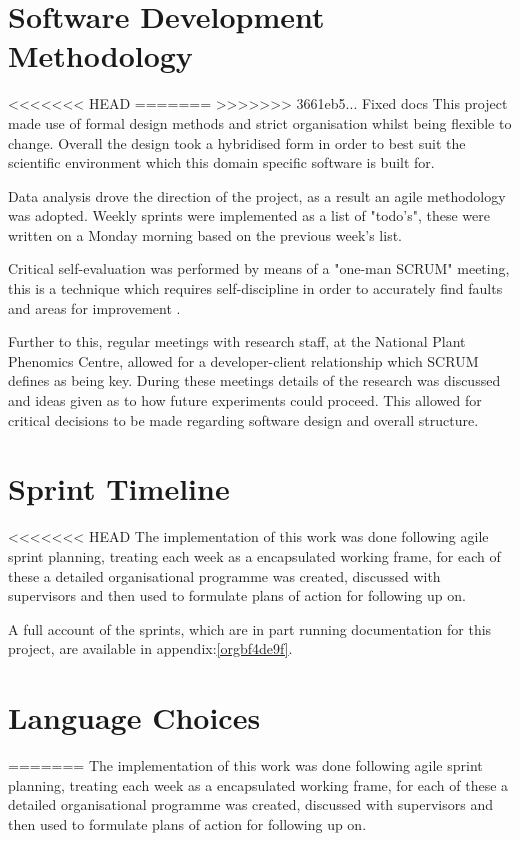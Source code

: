 \documentclass[11pt]{report}
\begin{document}
\section{Software Development Methodology}
<<<<<<< HEAD
\label{sec:org466d032}
=======
\label{sec:orged044ce}
>>>>>>> 3661eb5... Fixed docs
This project made use of formal design methods and strict organisation whilst being flexible to change. Overall the design took a hybridised form in order to best suit the scientific environment which this domain specific software is built for.

Data analysis drove the direction of the project, as a result an agile methodology was adopted.
Weekly sprints were implemented as a list of "todo's", these were written on a Monday morning based on the previous week's list.

Critical self-evaluation was performed by means of a "one-man SCRUM" meeting, this is a technique which requires self-discipline in order to accurately find faults and areas for improvement \cite{Andrews}.

Further to this, regular meetings with research staff, at the National Plant Phenomics Centre,  allowed for a developer-client relationship which SCRUM defines as being key. During these meetings details of the research was discussed and ideas given as to how future experiments could proceed. This allowed for critical decisions to be made regarding software design and overall structure.
\section{Sprint Timeline}
<<<<<<< HEAD
\label{sec:orgcefdb9b}
The implementation of this work was done following agile sprint planning, treating each week as a encapsulated working frame, for each of these a detailed organisational programme was created, discussed with supervisors and then used to formulate plans of action for following up on.

A full account of the sprints, which are in part running documentation for this project, are available in appendix:\ref{orgbf4de9f}.

\section{Language Choices}
\label{sec:org608fb9a}
=======
\label{sec:orgb9956a2}
The implementation of this work was done following agile sprint planning, treating each week as a encapsulated working frame, for each of these a detailed organisational programme was created, discussed with supervisors and then used to formulate plans of action for following up on.
\end{document}

